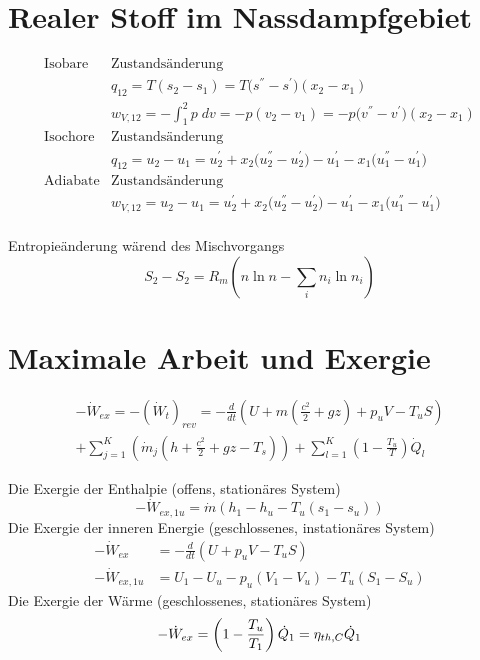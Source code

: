 \documentclass[twocolumn]{article}
\begin{document}
\section{Realer Stoff im Nassdampfgebiet}
\begin{align*}
	\text{Isobare} &\text{Zustandsänderung} \\
	&q_{12} = T(s_2 - s_1) = T\Big(s^{''} - s^{'}\Big)(x_2-x_1) \\
	&w_{V,12} = - \int_{1}^{2} p\; dv = -p(v_2-v_1) = -p\Big(v^{''} -v^{'}\Big)(x_2-x_1) \\
	\text{Isochore} &\text{Zustandsänderung} \\
	&q_{12} = u_2 - u_1 = u_2^{'} + x_2\Big(u_2^{''} - u_2^{'} \Big) - u_1^{'} - x_1\Big(u_1^{''} - u_1^{'}\Big) \\
	\text{Adiabate} &\text{Zustandsänderung} \\
	& w_{V,12} = u_2 - u_1 = u_2^{'} + x_2 \Big( u_2^{''} - u_2^{'} \Big) - u_1^{'} - x_1\Big(u_1^{''} - u_1^{'}\Big) \\
\end{align*}

Entropieänderung wärend des Mischvorgangs
\begin{equation}
	S_2-S_2 = R_m \left ( n \ln n - \sum_{i}^{} n_i \ln n_i \right )
\end{equation}
\section{Maximale Arbeit und Exergie}

\begin{multline}
	-\dot{W}_{ex} = - (\dot{W}_t)_{rev} = -\frac{d}{dt} \left( U + m\left ( \frac{c^2}{2}+ gz \right) + p_uV - T_uS \right) \\  +  \sum_{j=1}^{K} \left(\dot{m}_j \left(h + \frac{c^2}{2} + gz -T_s \right) \right) + \sum_{l=1}^{K} \left( 1 - \frac{T_u}{T}\right) \dot{Q}_l 
\end{multline}

Die Exergie der Enthalpie (offens, stationäres System)
\begin{equation}
	-\dot{W}_{ex,1u} = \dot{m}(h_1 - h_u -T_u(s_1 - s_u))
\end{equation}
Die Exergie der inneren Energie (geschlossenes, instationäres System)
\begin{align}
	- \dot{W}_{ex} &= - \frac{d}{dt}(U + p_uV -T_uS) \\
	-\dot{W}_{ex,1u} &= U_1 - U_u -p_u(V_1 - V_u) - T_u(S_1 - S_u)
\end{align}
Die Exergie der Wärme (geschlossenes, stationäres System)
\begin{equation}
	- \dot{W}_{ex} = \left(1 - \frac{T_u}{T_1} \right) \dot{Q}_1 = \eta_{th,C} \dot{Q}_1 \\
\end{equation}
\pagebreak
\end{document}
